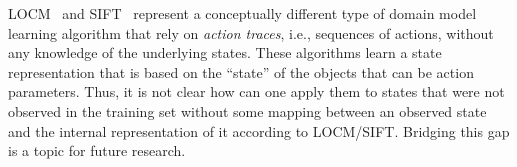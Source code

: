 \documentclass[letterpaper]{article} %
\newif\ifaddcomments
\newcommand{\roni}[1]{\ifaddcomments{\textcolor{red}{[Roni: #1]}}\fi}
\newcommand{\mauro}[1]{\ifaddcomments{\textcolor{green}{[Mauro: #1]}}\fi}
\newcommand{\yarin}[1]{\ifaddcomments{\textcolor{teal}{[Yarin: #1]}}\fi}
\begin{document}
LOCM~\citep{cresswell2013acquiring} and SIFT~\citep{gosgens2024learning} represent a conceptually different type of domain model learning algorithm that rely on \emph{action traces}, i.e., sequences of actions, without any knowledge of the underlying states. 
These algorithms learn a state representation that is based on the ``state'' of the objects that can be action parameters. 
Thus, it is not clear how can one apply them to states that were not observed in the training set without some mapping between an observed state and the internal representation of it according to LOCM/SIFT. Bridging this gap is a topic for future research.  
\end{document}
